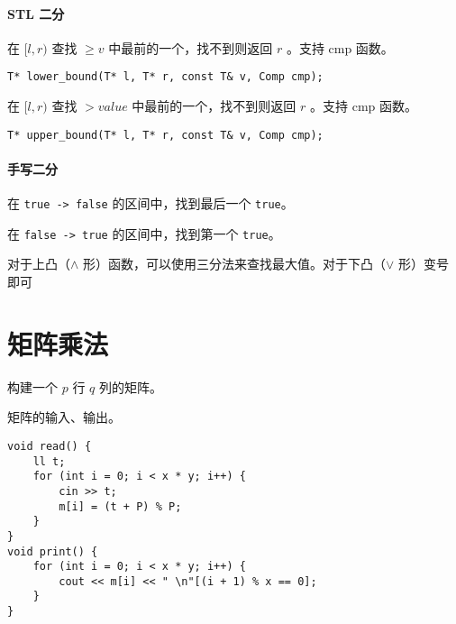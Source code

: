 \documentclass{probook}
\begin{document}
\begin{multicols}{2}
\paragraph*{STL 二分}

在 $[l,r)$ 查找 $\geqslant v$ 中最前的一个，找不到则返回 $r$ 。支持 cmp 函数。

\begin{lstlisting}[style=cpp]
T* lower_bound(T* l, T* r, const T& v, Comp cmp);
\end{lstlisting}

在 $[l,r)$ 查找 $> value$ 中最前的一个，找不到则返回 $r$ 。支持 cmp 函数。

\begin{lstlisting}[style=cpp]
T* upper_bound(T* l, T* r, const T& v, Comp cmp);
\end{lstlisting}

\paragraph*{手写二分}

在 \lstinline{true -> false} 的区间中，找到最后一个 \lstinline{true}。



在 \lstinline{false -> true} 的区间中，找到第一个 \lstinline{true}。



对于上凸（$\wedge$ 形）函数，可以使用三分法来查找最大值。对于下凸（$\vee$ 形）变号即可



\section{矩阵乘法}

构建一个 $p$ 行 $q$ 列的矩阵。



矩阵的输入、输出。

\begin{lstlisting}[style=cpp]
void read() {
	ll t;
	for (int i = 0; i < x * y; i++) {
		cin >> t;
		m[i] = (t + P) % P;
	}
}
void print() {
	for (int i = 0; i < x * y; i++) {
		cout << m[i] << " \n"[(i + 1) % x == 0];
	}
}
\end{lstlisting}


\end{multicols}
\end{document}
